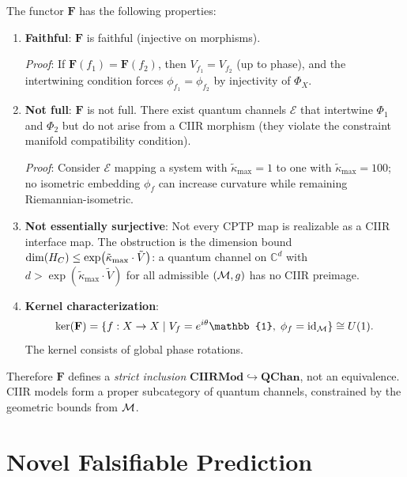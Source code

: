 \begin{theorem}\label{thm:12.13}
The functor $\mathbf{F}$ has the following properties:
\begin{enumerate}
  \item \textbf{Faithful}: $\mathbf{F}$ is faithful (injective on morphisms).

    \emph{Proof}: If $\mathbf{F}(f_1) = \mathbf{F}(f_2)$, then
    $V_{f_1} = V_{f_2}$ (up to phase), and the intertwining condition
    forces $\phi_{f_1} = \phi_{f_2}$ by injectivity of $\Phi_X$.

  \item \textbf{Not full}: $\mathbf{F}$ is not full.  There exist
    quantum channels $\mathcal{E}$ that intertwine $\Phi_1$ and $\Phi_2$
    but do not arise from a CIIR morphism (they violate the constraint
    manifold compatibility condition).

    \emph{Proof}: Consider $\mathcal{E}$ mapping a system with
    $\tilde{\kappa}_{\max} = 1$ to one with $\tilde{\kappa}_{\max} = 100$;
    no isometric embedding $\phi_f$ can increase curvature while
    remaining Riemannian-isometric.

  \item \textbf{Not essentially surjective}: Not every CPTP map is
    realizable as a CIIR interface map.  The obstruction is the
    dimension bound $\dim(H_C) \leq \exp(\tilde{\kappa}_{\max} \cdot \tilde{V})$:
    a quantum channel on $\mathbb{C}^d$ with $d > \exp(\tilde{\kappa}_{\max} \cdot \tilde{V})$
    for all admissible $(\mathcal{M}, g)$ has no CIIR preimage.

  \item \textbf{Kernel characterization}:
    \begin{equation}\label{eq:kernel}
      \ker(\mathbf{F}) = \{f : X \to X \mid V_f = e^{i\theta}\mathbb{1},\;
      \phi_f = \mathrm{id}_\CM\} \cong U(1).
    \end{equation}
    The kernel consists of global phase rotations.
\end{enumerate}
Therefore $\mathbf{F}$ defines a \emph{strict inclusion}
$\mathbf{CIIRMod} \hookrightarrow \mathbf{QChan}$, not an equivalence.
CIIR models form a proper subcategory of quantum channels, constrained
by the geometric bounds from $\mathcal{M}$.
\end{theorem}

\section{Novel Falsifiable Prediction}
\label{sec:prediction}

